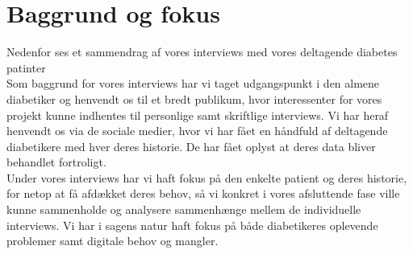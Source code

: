 \section{Baggrund og fokus}
Nedenfor ses et sammendrag af vores interviews med vores deltagende diabetes patinter\\
Som baggrund for vores interviews har vi taget udgangspunkt i den almene diabetiker og henvendt os til et bredt publikum, hvor interessenter for vores projekt kunne indhentes til personlige samt skriftlige interviews. Vi har heraf henvendt os via de sociale medier, hvor vi har fået en håndfuld af deltagende diabetikere med hver deres historie. De har fået oplyst at deres data bliver behandlet fortroligt.\\
Under vores interviews har vi haft fokus på den enkelte patient og deres historie, for netop at få afdækket deres behov, så vi konkret i vores afsluttende fase ville kunne sammenholde og analysere sammenhænge mellem de individuelle interviews. Vi har i sagens natur haft fokus på både diabetikeres oplevende problemer samt digitale behov og mangler.



